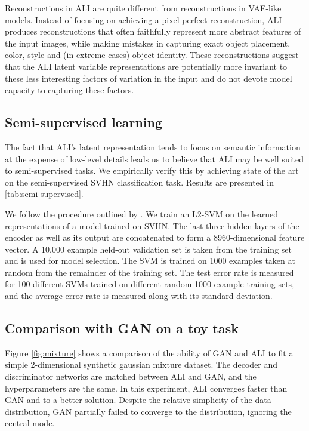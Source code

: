 \documentclass{article}
\begin{document}
Reconstructions in ALI are quite different from reconstructions in
VAE-like models. Instead of focusing on achieving a pixel-perfect
reconstruction, ALI produces reconstructions that often faithfully
represent more abstract features of the input images, while   
 making mistakes in capturing exact object placement, color, style and
(in extreme cases) object identity. These reconstructions suggest that the
ALI latent variable representations are potentially more invariant to these less
interesting factors of variation in the input and do not devote model
capacity to capturing these factors.

\subsection{Semi-supervised learning}
The fact that ALI's latent representation tends to focus on semantic
information at the expense of low-level details leads us to believe that
ALI may be well suited to semi-supervised tasks. We empirically verify this
by achieving state of the art on the semi-supervised SVHN classification task.
Results are presented in \autoref{tab:semi-supervised}.

We follow the procedure outlined by \citet{radford2015unsupervised}. We train an
L2-SVM on the learned representations of a model trained on SVHN. The last three
hidden layers of the encoder as well as its output are concatenated to form a
8960-dimensional feature vector. A 10,000 example held-out validation set is
taken from the training set and is used for model selection. The SVM is trained
on 1000 examples taken at random from the remainder of the training set. The
test error rate is measured for 100 different SVMs trained on different random
1000-example training sets, and the average error rate is measured along with
its standard deviation.

\subsection{Comparison with GAN on a toy task}

Figure \ref{fig:mixture} shows a comparison of the ability of GAN and ALI to fit
a simple 2-dimensional synthetic gaussian mixture dataset. The decoder and
discriminator networks are matched between ALI and GAN, and the hyperparameters
are the same. In this experiment, ALI converges faster than GAN and to a better
solution.  Despite the relative simplicity of the data distribution, GAN
partially failed to converge to the distribution, ignoring the central mode.
\end{document}

